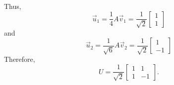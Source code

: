 \documentclass{ximera}
\begin{document}
\begin{example}
Thus,
\[ \vec{u}_1 = \frac{1}{4}A\vec{v}_1
= \frac{1}{\sqrt 2}\left[\begin{array}{r} 1\\ 1 \end{array}\right]\]
and
\[ \vec{u}_2 = \frac{1}{\sqrt 6}A\vec{v}_2
=\frac{1}{\sqrt 2}\left[\begin{array}{r} 1\\ -1 \end{array}\right]
\]
Therefore,
\[ U=\frac{1}{\sqrt{2}}\left[\begin{array}{rr} 1 & 1 \\
1 & -1 \end{array}\right].\]

\end{example}
 
\end{document}
